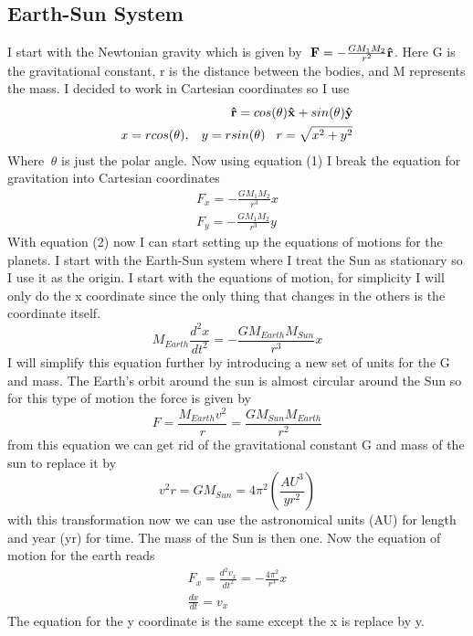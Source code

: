 \documentclass[11pt,a4wide]{article}
\begin{document}
\subsection{Earth-Sun System}
I start with the Newtonian gravity which is given by $\ {\bf F} = - \frac{GM_1M_2}{r^2} {\bf \hat{r}}$. Here G is the gravitational constant, r is the distance between the bodies, and M represents the mass. I decided to work in Cartesian coordinates so I use 
\begin{equation}
\begin{split}
    {\bf \hat{r}} = cos(\theta){\bf \hat{x}} + sin(\theta){\bf \hat{y}}\\
    x=rcos(\theta), \hspace{0.3cm} y=rsin(\theta) \hspace{0.3cm} r = \sqrt{x^2 + y^2}
\end{split} 
\end{equation}
Where $\ \theta$ is just the polar angle. Now using equation (1) I break the equation for gravitation into Cartesian coordinates 
\begin{equation}
\begin{split}
	F_x = -\frac{GM_1M_2}{r^3}x \\
	F_y = -\frac{GM_1M_2}{r^3}y 
\end{split}
\end{equation}
With equation (2) now I can start setting up the equations of motions for the planets. I start with the Earth-Sun system where I treat the Sun as stationary so I use it as the origin. I start with the equations of motion, for simplicity I will only do the x coordinate since the only thing that changes in the others is the coordinate itself.  
\[
	M_{Earth}\frac{d^2x}{dt^2} = -\frac{GM_{Earth}M_{Sun}}{r^3}x
\]
I will simplify this equation further by introducing a new set of units for the G and mass. The Earth's orbit around the sun is almost circular around the Sun so for this type of motion the force is given by 
\[
	F =\frac{M_{Earth}v^2}{r}=\frac{GM_{Sun}M_{Earth}}{r^2}
\]
from this equation we can get rid of the gravitational constant G and mass of the sun to replace it by 
\begin{equation}
	v^2r=GM_{Sun}=4\pi^2 (\frac{AU^3}{yr^2})
\end{equation}
with this transformation now we can use the astronomical units (AU) for length and year (yr) for time. The mass of the Sun is then one. Now the equation of motion for the earth reads 
\begin{equation}
\begin{split}
	F_x = \frac{d^2v_x}{dt^2} = -\frac{4\pi^2}{r^3}x \\
	\frac{dx}{dt}=v_x
\end{split}
\end{equation}
The equation for the y coordinate is the same except the x is replace by y. 
\end{document}
